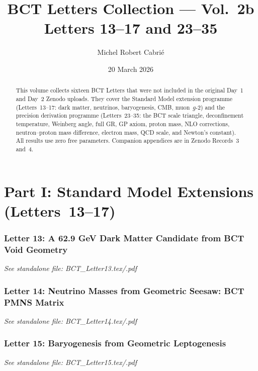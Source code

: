 \documentclass[aps,preprint,superscriptaddress,floatfix]{revtex4-2}
\begin{document}
\title{BCT Letters Collection --- Vol.~2b\\Letters 13--17 and 23--35}

\author{Michel Robert Cabri\'{e}}
\date{20 March 2026}

\begin{abstract}
This volume collects sixteen BCT Letters that were not included in the original Day~1 and Day~2 Zenodo uploads. They cover the Standard Model extension programme (Letters~13--17: dark matter, neutrinos, baryogenesis, CMB, muon~$g$-2) and the precision derivation programme (Letters~23--35: the BCT scale triangle, deconfinement temperature, Weinberg angle, full GR, GP axiom, proton mass, NLO corrections, neutron--proton mass difference, electron mass, QCD scale, and Newton's constant). All results use zero free parameters. Companion appendices are in Zenodo Records~3 and~4.
\end{abstract}

\maketitle
\tableofcontents

\newpage
\part*{Part I: Standard Model Extensions (Letters~13--17)}

\newpage
\section*{Letter 13: A 62.9 GeV Dark Matter Candidate from BCT Void Geometry}
\textit{See standalone file: BCT\_Letter13.tex/.pdf}

\newpage
\section*{Letter 14: Neutrino Masses from Geometric Seesaw: BCT PMNS Matrix}
\textit{See standalone file: BCT\_Letter14.tex/.pdf}

\newpage
\section*{Letter 15: Baryogenesis from Geometric Leptogenesis}
\textit{See standalone file: BCT\_Letter15.tex/.pdf}
\end{document}
